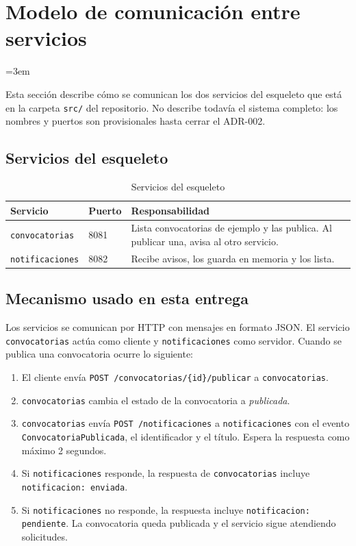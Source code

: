 \section{Modelo de comunicación entre servicios}
\emergencystretch=3em

Esta sección describe cómo se comunican los dos servicios del esqueleto que está en la carpeta \texttt{src/} del repositorio. No describe todavía el sistema completo: los nombres y puertos son provisionales hasta cerrar el ADR-002.

\subsection{Servicios del esqueleto}

\begin{table}[H]
\centering
\small
\caption{Servicios del esqueleto}
\begin{tabularx}{\linewidth}{@{}p{3.1cm}p{1.6cm}X@{}}
\toprule
\textbf{Servicio} & \textbf{Puerto} & \textbf{Responsabilidad} \\
\midrule
\texttt{convocatorias} & 8081 & Lista convocatorias de ejemplo y las publica. Al publicar una, avisa al otro servicio. \\
\texttt{notificaciones} & 8082 & Recibe avisos, los guarda en memoria y los lista. \\
\bottomrule
\end{tabularx}
\end{table}

\subsection{Mecanismo usado en esta entrega}

Los servicios se comunican por HTTP con mensajes en formato JSON. El servicio \texttt{convocatorias} actúa como cliente y \texttt{notificaciones} como servidor. Cuando se publica una convocatoria ocurre lo siguiente:

\begin{enumerate}[leftmargin=*]
  \item El cliente envía \texttt{POST /convocatorias/\{id\}/publicar} a \texttt{convocatorias}.
  \item \texttt{convocatorias} cambia el estado de la convocatoria a \emph{publicada}.
  \item \texttt{convocatorias} envía \texttt{POST /notificaciones} a \texttt{notificaciones} con el evento \texttt{ConvocatoriaPublicada}, el identificador y el título. Espera la respuesta como máximo 2 segundos.
  \item Si \texttt{notificaciones} responde, la respuesta de \texttt{convocatorias} incluye \texttt{notificacion: enviada}.
  \item Si \texttt{notificaciones} no responde, la respuesta incluye \texttt{notificacion: pendiente}. La convocatoria queda publicada y el servicio sigue atendiendo solicitudes.
\end{enumerate}

